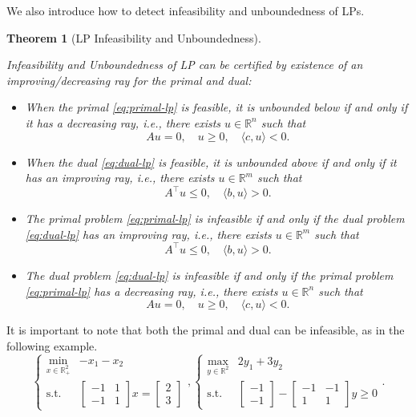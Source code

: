 \documentclass[
]{book}
\newtheorem{theorem}{Theorem}[chapter]
\theoremstyle{definition}
\theoremstyle{definition}
\theoremstyle{definition}
\theoremstyle{definition}
\theoremstyle{remark}
\begin{document}
We also introduce how to detect infeasibility and unboundedness of LPs.

\begin{theorem}[LP Infeasibility and Unboundedness]
\protect\hypertarget{thm:LPInfeasUnbound}{}\label{thm:LPInfeasUnbound}

Infeasibility and Unboundedness of LP can be certified by existence of an improving/decreasing ray for the primal and dual:

\begin{itemize}
\item
  When the primal \eqref{eq:primal-lp} is feasible, it is unbounded below if and only if it has a decreasing ray, i.e., there exists \(u \in \mathbb{R}^{n}\) such that
  \[
  A u = 0, \quad u \geq 0, \quad \langle c, u \rangle < 0.
  \]
\item
  When the dual \eqref{eq:dual-lp} is feasible, it is unbounded above if and only if it has an improving ray, i.e., there exists \(u \in \mathbb{R}^{m}\) such that
  \[
  A^\top u \leq 0, \quad \langle b, u \rangle > 0. 
  \]
\item
  The primal problem \eqref{eq:primal-lp} is infeasible if and only if the dual problem \eqref{eq:dual-lp} has an improving ray, i.e., there exists \(u \in \mathbb{R}^{m}\) such that
  \[
  A^\top u \leq 0, \quad \langle b, u \rangle > 0.
  \]
\item
  The dual problem \eqref{eq:dual-lp} is infeasible if and only if the primal problem \eqref{eq:primal-lp} has a decreasing ray, i.e., there exists \(u \in \mathbb{R}^{n}\) such that
  \[
  A u = 0, \quad u \geq 0, \quad \langle c, u \rangle < 0.
  \]
\end{itemize}

\end{theorem}

It is important to note that both the primal and dual can be infeasible, as in the following example.
\begin{equation}
\begin{cases}
\min_{x \in \mathbb{R}^{2}_{+}} & - x_1 - x_2 \\
\mathrm{s.t.}& \begin{bmatrix} -1 & 1 \\ -1 & 1 \end{bmatrix} x = \begin{bmatrix} 2 \\ 3 \end{bmatrix}
\end{cases},
\begin{cases}
\max_{y \in \mathbb{R}^{2}} & 2 y_1 + 3 y_2 \\
\mathrm{s.t.}& \begin{bmatrix} -1 \\ -1 \end{bmatrix} - \begin{bmatrix} -1 & -1 \\ 1 & 1 \end{bmatrix} y \geq 0
\end{cases}.
\end{equation}
\end{document}

